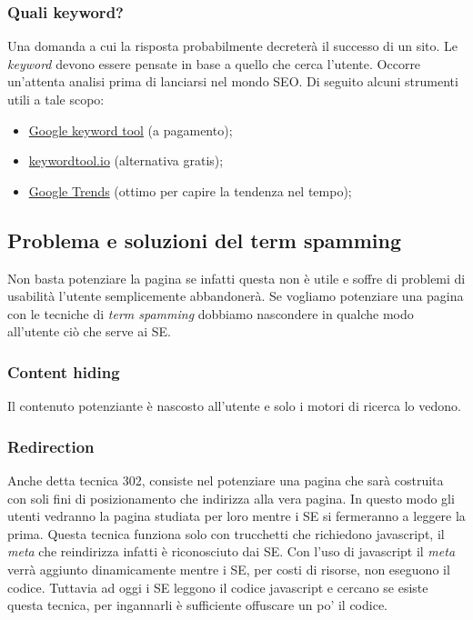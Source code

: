 			\subsubsection{Quali keyword?}
				Una domanda a cui la risposta probabilmente decreterà il successo di un sito. Le \emph{keyword} devono essere pensate in base a quello che cerca l'utente. Occorre un'attenta analisi prima di lanciarsi nel mondo SEO. Di seguito alcuni strumenti utili a tale scopo:
				\begin{itemize}
					\item \href{https://adwords.google.com/KeywordPlanner}{Google keyword tool} (a pagamento);
					\item \href{http://keywordtool.io/}{keywordtool.io} (alternativa gratis);
					\item \href{https://www.google.it/trends/}{Google Trends} (ottimo per capire la tendenza nel tempo);
				\end{itemize}
			
		\subsection{Problema e soluzioni del term spamming}
			Non basta potenziare la pagina se infatti questa non è utile e soffre di problemi di usabilità l'utente semplicemente abbandonerà. Se vogliamo potenziare una pagina con le tecniche di \emph{term spamming} dobbiamo nascondere in qualche modo all'utente ciò che serve ai SE.
		
			\subsubsection{Content hiding}
				Il contenuto potenziante è nascosto all'utente e solo i motori di ricerca lo vedono.
			
			\subsubsection{Redirection}
				Anche detta tecnica 302, consiste nel potenziare una pagina che sarà costruita con soli fini di posizionamento che indirizza alla vera pagina. In questo modo gli utenti vedranno la pagina studiata per loro mentre i SE si fermeranno a leggere la prima. Questa tecnica funziona solo con trucchetti che richiedono javascript, il \emph{meta} che reindirizza infatti è riconosciuto dai SE. Con l'uso di javascript il \emph{meta} verrà aggiunto dinamicamente mentre i SE, per costi di risorse, non eseguono il codice. Tuttavia ad oggi i SE leggono il codice javascript e cercano se esiste questa tecnica, per ingannarli è sufficiente offuscare un po' il codice.
			
